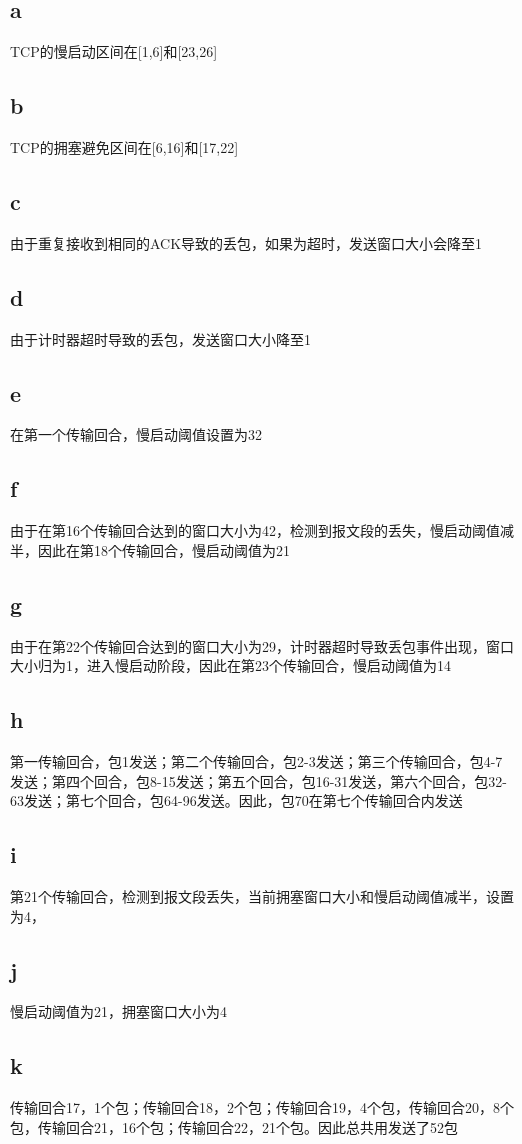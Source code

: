 \documentclass[UTF8]{article}
\begin{document}
\subsection*{a}
\vspace*{-0.55cm}
TCP的慢启动区间在[1,6]和[23,26]
\subsection*{b}
\vspace*{-0.55cm}
TCP的拥塞避免区间在[6,16]和[17,22]
\subsection*{c}
\vspace*{-0.55cm}
由于重复接收到相同的ACK导致的丢包，如果为超时，发送窗口大小会降至1
\subsection*{d}
\vspace*{-0.55cm}
由于计时器超时导致的丢包，发送窗口大小降至1
\subsection*{e}
\vspace*{-0.55cm}
在第一个传输回合，慢启动阈值设置为32
\subsection*{f}
\vspace*{-0.55cm}
由于在第16个传输回合达到的窗口大小为42，检测到报文段的丢失，慢启动阈值减半，因此在第18个传输回合，慢启动阈值为21
\subsection*{g}
\vspace*{-0.55cm}
由于在第22个传输回合达到的窗口大小为29，计时器超时导致丢包事件出现，窗口大小归为1，进入慢启动阶段，因此在第23个传输回合，慢启动阈值为14
\subsection*{h}
\vspace*{-0.55cm}
第一传输回合，包1发送；第二个传输回合，包2-3发送；第三个传输回合，包4-7发送；第四个回合，包8-15发送；第五个回合，包16-31发送，第六个回合，包32-63发送；第七个回合，包64-96发送。因此，包70在第七个传输回合内发送
\subsection*{i}
\vspace*{-0.55cm}
第21个传输回合，检测到报文段丢失，当前拥塞窗口大小和慢启动阈值减半，设置为4，
\subsection*{j}
\vspace*{-0.55cm}
慢启动阈值为21，拥塞窗口大小为4
\subsection*{k}
\vspace*{-0.55cm}
传输回合17，1个包；传输回合18，2个包；传输回合19，4个包，传输回合20，8个包，传输回合21，16个包；传输回合22，21个包。因此总共用发送了52包
\end{document}
